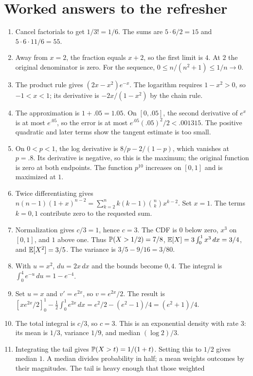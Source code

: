 \section{Worked answers to the refresher}
\begin{enumerate}
 \item Cancel factorials to get $1/3!=1/6$. The sums are
 $5\cdot6/2=15$ and $5\cdot6\cdot11/6=55$.
 \item Away from $x=2$, the fraction equals $x+2$, so the first
 limit is $4$. At $2$ the original denominator is zero.
 For the sequence, $0\le n/(n^2+1)\le1/n\to0$.
 \item The product rule gives $(2x-x^2)e^{-x}$.
 The logarithm requires $1-x^2>0$, so $-1<x<1$;
 its derivative is $-2x/(1-x^2)$ by the chain rule.
 \item The approximation is $1+.05=1.05$. On $[0,.05]$,
 the second derivative of $e^x$ is at most $e^{.05}$, so the error
 is at most $e^{.05}(.05)^2/2<.001315$. The positive quadratic
 and later terms show the tangent estimate is too small.
 \item On $0<p<1$, the log derivative is $8/p-2/(1-p)$,
 which vanishes at $p=.8$. Its derivative is negative, so this is
 the maximum; the original function is zero at both endpoints.
 The function $p^{10}$ increases on $[0,1]$ and is maximized at $1$.
 \item Twice differentiating gives
 $n(n-1)(1+x)^{n-2}=\sum_{k=2}^n k(k-1)\binom nkx^{k-2}$.
 Set $x=1$. The terms $k=0,1$ contribute zero to the requested sum.
 \item Normalization gives $c/3=1$, hence $c=3$.
 The CDF is $0$ below zero, $x^3$ on $[0,1]$, and $1$ above one.
 Thus $\P(X>1/2)=7/8$,
 $\E[X]=3\int_0^1x^3\,dx=3/4$, and
 $\E[X^2]=3/5$. The variance is $3/5-9/16=3/80$.
 \item With $u=x^2$, $du=2x\,dx$ and the bounds become $0,4$.
 The integral is $\int_0^4e^{-u}\,du=1-e^{-4}$.
 \item Set $u=x$ and $v'=e^{2x}$, so $v=e^{2x}/2$.
 The result is
 $[xe^{2x}/2]_0^1-\frac12\int_0^1e^{2x}\,dx
 =e^2/2-(e^2-1)/4=(e^2+1)/4$.
 \item The total integral is $c/3$, so $c=3$.
 This is an exponential density with rate $3$: its mean is $1/3$,
 variance $1/9$, and median $(\log2)/3$.
 \newpage
 \item Integrating the tail gives
 $\P(X>t)=1/(1+t)$. Setting this to $1/2$ gives median $1$.
 A median divides probability in half; a mean weights outcomes by
 their magnitudes. The tail is heavy enough that those weighted

\end{enumerate}
